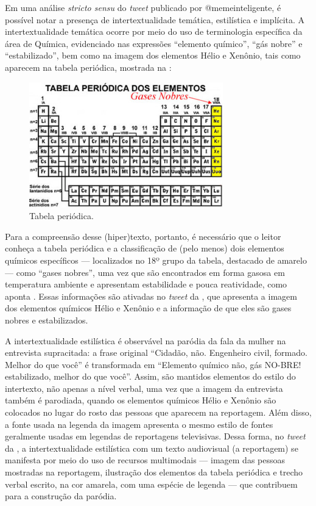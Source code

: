 \documentclass{textolivre}
\begin{document}
Em uma análise \textit{stricto sensu} do \textit{tweet} publicado por @memeinteligente, é possível notar a presença de intertextualidade temática, estilística e implícita. A intertextualidade temática ocorre por meio do uso de terminologia específica da área de Química, evidenciado nas expressões “elemento químico”, “gás nobre” e “estabilizado”, bem como na imagem dos elementos Hélio e Xenônio, tais como aparecem na tabela periódica, mostrada na :

\begin{figure}[htbp]
 \centering
 \includegraphics[width=0.75\textwidth]{Fig3.png}
 \caption{Tabela periódica.}
 \label{fig03}
\end{figure}

Para a compreensão desse (hiper)texto, portanto, é necessário que o leitor conheça a tabela periódica e a classificação de (pelo menos) dois elementos químicos específicos — localizados no 18º grupo da tabela, destacado de amarelo — como “gases nobres”, uma vez que são encontrados em forma gasosa em temperatura ambiente e apresentam estabilidade e pouca reatividade, como aponta \textcite{fogaca_gases_nodate}. Essas informações são ativadas no \textit{tweet} da , que apresenta a imagem dos elementos químicos Hélio e Xenônio e a informação de que eles são gases nobres e estabilizados.

A intertextualidade estilística é observável na paródia da fala da mulher na entrevista supracitada: a frase original “Cidadão, não. Engenheiro civil, formado. Melhor do que você” é transformada em “Elemento químico não, gás NO-BRE! estabilizado, melhor do que você”. Assim, são mantidos elementos do estilo do intertexto, não apenas a nível verbal, uma vez que a imagem da entrevista também é parodiada, quando os elementos químicos Hélio e Xenônio são colocados no lugar do rosto das pessoas que aparecem na reportagem. Além disso, a fonte usada na legenda da imagem apresenta o mesmo estilo de fontes geralmente usadas em legendas de reportagens televisivas. Dessa forma, no \textit{tweet} da , a intertextualidade estilística com um texto audiovisual (a reportagem) se manifesta por meio do uso de recursos multimodais — imagem das pessoas mostradas na reportagem, ilustração dos elementos da tabela periódica e trecho verbal escrito, na cor amarela, com uma espécie de legenda — que contribuem para a construção da paródia.
\end{document}
